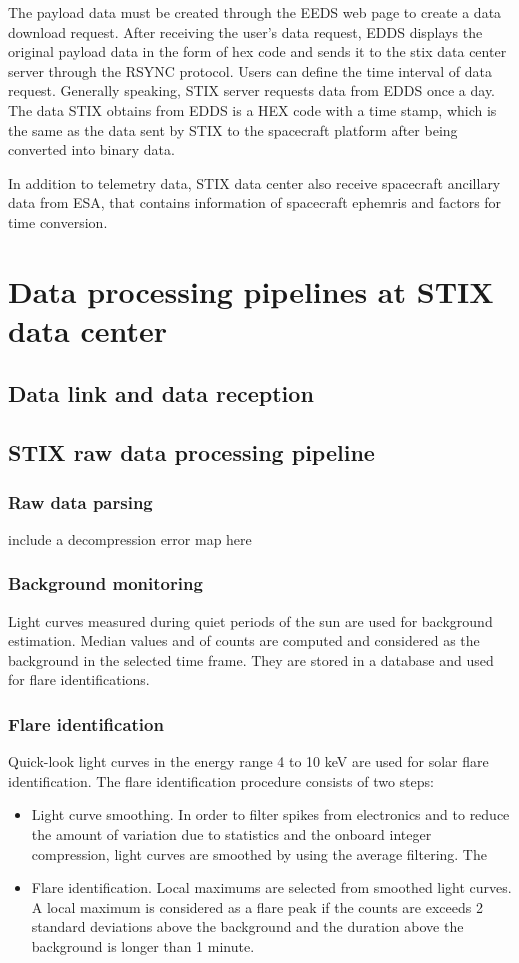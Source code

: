\documentclass{aa}
\begin{document}
The payload data must be created through the EEDS web page to create a data download request. After receiving the user's data request, EDDS displays the original payload data in the form of hex code and sends it to the stix data center server through the RSYNC protocol. Users can define the time interval of data request. Generally speaking, STIX server requests data from EDDS once a day. The data STIX obtains from EDDS is a HEX code with a time stamp, which is the same as the data sent by STIX to the spacecraft platform after being converted into binary data.

In addition to telemetry data, STIX data center also receive spacecraft ancillary data from ESA, that contains
information of spacecraft ephemris and factors for time conversion.


\section{Data processing pipelines at STIX data center}



\subsection{Data link and data reception}

\subsection{STIX raw data processing pipeline}
\subsubsection{Raw data parsing}

include a decompression error map here
\subsubsection{Background monitoring}
Light curves measured during quiet periods of the sun are used for background estimation. Median values and of counts are computed and considered as the background in the selected time frame. They are stored in a database and used for flare identifications. 
\subsubsection{Flare identification}
Quick-look light curves in the energy range 4 to 10 keV are used for solar flare identification.  The flare identification procedure consists of  two steps:
\begin{itemize}
\item Light curve smoothing. In order to filter spikes from electronics and to reduce the amount of variation due to statistics and the onboard integer compression, light curves are smoothed by using the average filtering. The 
\item Flare identification. Local maximums are selected from smoothed light curves.  A local maximum is considered as a flare peak if the counts are exceeds 2 standard deviations above the background and the duration above the background is longer than 1 minute.  
\end{itemize}
\end{document}
